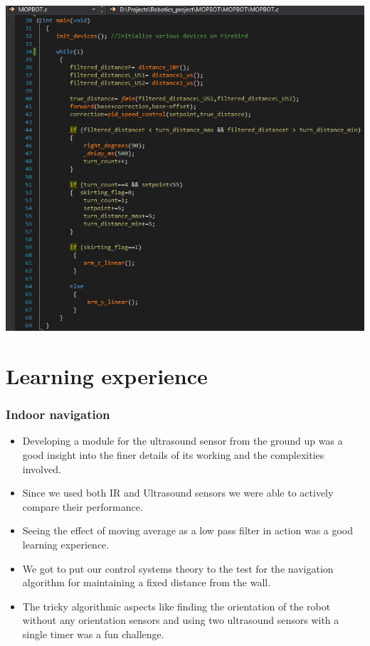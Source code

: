 \documentclass[12pt]{article}
\begin{document}
\begin{center}
\includegraphics[width=1.1\textwidth]{21.jpg}
\end{center}

\part{Learning experience}

\section{Indoor navigation}

\begin{itemize}
\item Developing a module for the ultrasound sensor from the ground up was a good insight into the finer details of its working and the complexities involved.
\item Since we used both IR and Ultrasound sensors we were able to actively compare their performance.
\item Seeing the effect of moving average as a low pass filter in action was a good learning experience.
\item We got to put our control systems theory to the test for the navigation algorithm for maintaining a fixed distance from the wall.
\item The tricky algorithmic aspects like finding the orientation of the robot without any orientation sensors and using two ultrasound sensors with a single timer was a fun challenge.
\end{itemize}
\end{document}
